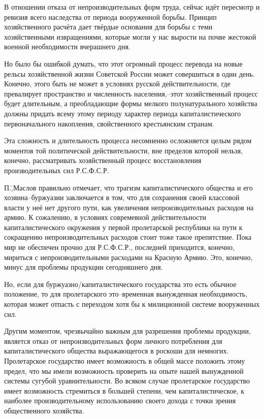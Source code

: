 В отношении отказа от непроизводительных форм труда, сейчас идёт пересмотр и ревизия всего наследства от периода вооруженной борьбы. Принцип хозяйственного расчёта дает твёрдые основания для борьбы с теми хозяйственными извращениями, которые могли у нас вырости на почве жестокой военной необходимости вчерашнего дня.

Но было бы ошибкой думать, что этот огромный процесс перевода на новые рельсы хозяйственной жизни Советской России может совершиться в один день. Конечно, этого быть не может в условиях русской действительности, где превалирует пространство и численность населения,\---этот хозяйственный процесс будет длительным, а преобладающие формы мелкого полунатурального хозяйства должны придать всему этому периоду характер периода капиталистического первоначального накопления, свойственного крестьянским странам.

Эта сложность и длительность процесса несомненно осложняется целым рядом моментов той политической действительности, вне пределов которой нельзя, конечно, рассматривать хозяйственный процесс восстановления производительных сил Р.С.Ф.С.Р.

П.\=,Маслов правильно отмечает, что трагизм капиталистического общества и его хозяина\---буржуазии заключается в том, что для сохранения своей классовой власти у неё нет другого пути, как увеличения непроизводительных расходов на армию. К сожалению, в условиях совремевной действительности капиталистического окружения у первой пролетарской республики на пути к сокращению непроизводительных расходов стоит тоже такое препятствие. Пока мир не обеспечен прочно для Р.С.Ф.С.Р., последней приходится, конечно, мириться с непроизводительными расходами на Красную Армию. Это, конечно, минус для проблемы продукции сегодняшнего дня.

Но, если для буржуазно\-/капиталистического государства это есть обычное положение, то для пролетарского это\---временная вынужденная необходимость, которая может отпасть с переходом хотя бы к милиционной системе вооруженных сил.

Другим моментом, чрезвычайно важным для разрешения проблемы продукции, является отказ от непроизводительных форм личного потребления для капиталистического общества выражающегося в роскоши для немногих. Пролетарское государство имеет возможность в общей массе положить этому предел, что мы имели возможность проверить на опыте нашей вынужденной системы сугубой уравнительности. Во всяком случае пролетарское государство имеет возможность стремиться в большей степени, чем капиталистическое, к наиболее производительному использованию своего дохода с точки зрения общественного хозяйства.

